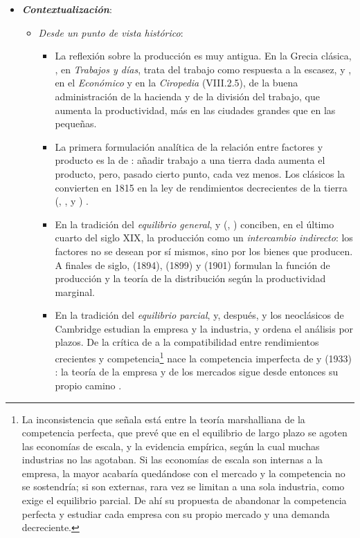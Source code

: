 \documentclass[11pt]{article}
\begin{document}
\begin{itemize}
\item \textbf{\emph{Contextualización}}:
  \begin{itemize}
  \item \emph{Desde un punto de vista histórico}\nocite{HET2026Production}:
  \begin{itemize}
  \item La reflexión sobre la producción es muy antigua. En la Grecia clásica, , en \emph{Trabajos y días}, trata del trabajo como respuesta a la escasez, y , en el \emph{Económico} y en la \emph{Ciropedia} (VIII.2.5), de la buena administración de la hacienda y de la división del trabajo, que aumenta la productividad, más en las ciudades grandes que en las pequeñas\nocite{Lowry1987Archaeology}.
  \item La primera formulación analítica de la relación entre factores y producto es la  de \textcite{Turgot1767Observations}: añadir trabajo a una tierra dada aumenta el producto, pero, pasado cierto punto, cada vez menos. Los clásicos la convierten en 1815 en la ley de rendimientos decrecientes de la tierra (, ,  y ) .
  \item En la tradición del \emph{equilibrio general}, \textcite{Walras1874Elements} y  (\citeyear{Pareto1896Cours}, \citeyear{Pareto1906Manuale}) conciben, en el último cuarto del siglo XIX, la producción como un \emph{intercambio indirecto}: los factores no se desean por sí mismos, sino por los bienes que producen. A finales de siglo,  (1894),  (1899) y  (1901) formulan la función de producción y la teoría de la distribución según la productividad marginal\nocite{Wicksteed1894Essay,Clark1899Distribution,Wicksell1901Forelasningar}.
  \item En la tradición del \emph{equilibrio parcial}, \textcite{Cournot1838Recherches} y, después, \textcite{Marshall1890Principles} y los neoclásicos de Cambridge estudian la empresa y la industria, y  ordena el análisis por plazos. De la crítica de \textcite{Sraffa1926Laws} a la compatibilidad entre rendimientos crecientes y competencia\footnote{La inconsistencia que señala  está entre la teoría marshalliana de la competencia perfecta, que prevé que en el equilibrio de largo plazo se agoten las economías de escala, y la evidencia empírica, según la cual muchas industrias no las agotaban. Si las economías de escala son internas a la empresa, la mayor acabaría quedándose con el mercado y la competencia no se sostendría; si son externas, rara vez se limitan a una sola industria, como exige el equilibrio parcial. De ahí su propuesta de abandonar la competencia perfecta y estudiar cada empresa con su propio mercado y una demanda decreciente.} nace la competencia imperfecta de  y  (1933) : la teoría de la empresa y de los mercados sigue desde entonces su propio camino .

\end{itemize}
\end{itemize}
\end{itemize}
\end{document}
